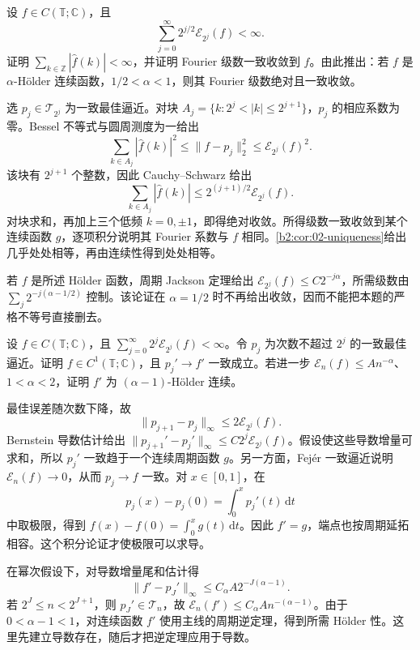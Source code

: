 \begin{exercise}\label{b2:ex:approximation-fourier-absolute}
设 \(f\in C(\mathbb T;\mathbb C)\)，且
\[
 \sum_{j=0}^\infty 2^{j/2}\mathcal E_{2^j}(f)<\infty.
\]
证明 \(\sum_{k\in\mathbb Z}|\widehat f(k)|<\infty\)，并证明 Fourier 级数一致收敛到 \(f\)。由此推出：若 \(f\) 是 \(\alpha\)-Hölder 连续函数，\(1/2<\alpha<1\)，则其 Fourier 级数绝对且一致收敛。
\end{exercise}
\begin{solution}
选 \(p_j\in\mathcal T_{2^j}\) 为一致最佳逼近。对块 \(A_j=\{k:2^j<|k|\leq2^{j+1}\}\)，\(p_j\) 的相应系数为零。Bessel 不等式与圆周测度为一给出
\[
 \sum_{k\in A_j}|\widehat f(k)|^2
 \leq\|f-p_j\|_2^2\leq\mathcal E_{2^j}(f)^2.
\]
该块有 \(2^{j+1}\) 个整数，因此 Cauchy--Schwarz 给出
\[
 \sum_{k\in A_j}|\widehat f(k)|\leq2^{(j+1)/2}\mathcal E_{2^j}(f).
\]
对块求和，再加上三个低频 \(k=0,\pm1\)，即得绝对收敛。所得级数一致收敛到某个连续函数 \(g\)，逐项积分说明其 Fourier 系数与 \(f\) 相同。\cref{b2:cor:02-uniqueness}给出几乎处处相等，再由连续性得到处处相等。

若 \(f\) 是所述 Hölder 函数，周期 Jackson 定理给出 \(\mathcal E_{2^j}(f)\leq C2^{-j\alpha}\)，所需级数由 \(\sum_j2^{-j(\alpha-1/2)}\) 控制。该论证在 \(\alpha=1/2\) 时不再给出收敛，因而不能把本题的严格不等号直接删去。
\end{solution}

\begin{optionalexercise}[由更快逼近恢复导数]\label{b2:ex:approximation-derivative-recovery}
设 \(f\in C(\mathbb T;\mathbb C)\)，且 \(\sum_{j=0}^\infty2^j\mathcal E_{2^j}(f)<\infty\)。令 \(p_j\) 为次数不超过 \(2^j\) 的一致最佳逼近。证明 \(f\in C^1(\mathbb T;\mathbb C)\)，且 \(p_j'\to f'\) 一致成立。若进一步 \(\mathcal E_n(f)\leq A n^{-\alpha}\)、\(1<\alpha<2\)，证明 \(f'\) 为 \((\alpha-1)\)-Hölder 连续。
\end{optionalexercise}
\begin{solution}
最佳误差随次数下降，故
\[
 \|p_{j+1}-p_j\|_\infty\leq2\mathcal E_{2^j}(f).
\]
Bernstein 导数估计给出 \(\|p_{j+1}'-p_j'\|_\infty\leq C2^j\mathcal E_{2^j}(f)\)。假设使这些导数增量可求和，所以 \(p_j'\) 一致趋于一个连续周期函数 \(g\)。另一方面，Fejér 一致逼近说明 \(\mathcal E_n(f)\to0\)，从而 \(p_j\to f\) 一致。对 \(x\in[0,1]\)，在
\[
 p_j(x)-p_j(0)=\int_0^xp_j'(t)\,\mathrm dt
\]
中取极限，得到 \(f(x)-f(0)=\int_0^xg(t)\,\mathrm dt\)。因此 \(f'=g\)，端点也按周期延拓相容。这个积分论证才使极限可以求导。

在幂次假设下，对导数增量尾和估计得
\[
 \|f'-p_J'\|_\infty\leq C_\alpha A2^{-J(\alpha-1)}.
\]
若 \(2^J\leq n<2^{J+1}\)，则 \(p_J'\in\mathcal T_n\)，故 \(\mathcal E_n(f')\leq C_\alpha A n^{-(\alpha-1)}\)。由于 \(0<\alpha-1<1\)，对连续函数 \(f'\) 使用主线的周期逆定理，得到所需 Hölder 性。这里先建立导数存在，随后才把逆定理应用于导数。
\end{solution}

